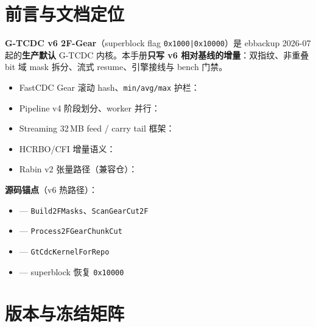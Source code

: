 \chapter*{前言与文档定位}

\begin{v6box}[本手册写什么]
\textbf{G-TCDC v6 2F-Gear}（superblock flag \texttt{0x1000|0x10000}）是 ebbackup 2026-07 起的\textbf{生产默认} G-TCDC 内核。本手册\textbf{只写 v6 相对基线的增量}：双指纹、非重叠 bit 域 mask 拆分、流式 resume、引擎接线与 bench 门禁。
\end{v6box}

\begin{designbox}
\begin{itemize}[nosep]
  \item FastCDC Gear 滚动 hash、\texttt{min/avg/max} 护栏：
  \item Pipeline v4 阶段划分、worker 并行：
  \item Streaming 32\,MB feed / carry tail 框架：
  \item HCRBO/CFI 增量语义：
  \item Rabin v2 张量路径（兼容仓）：
\end{itemize}
\end{designbox}

\textbf{源码锚点}（v6 热路径）：
\begin{itemize}[nosep]
  \item {} — \texttt{Build2FMasks}、\texttt{ScanGearCut2F}
  \item {} — \texttt{Process2FGearChunkCut}
  \item {} — \texttt{GtCdcKernelForRepo}
  \item {} — superblock 恢复 \texttt{0x10000}
\end{itemize}

\chapter*{版本与冻结矩阵}

